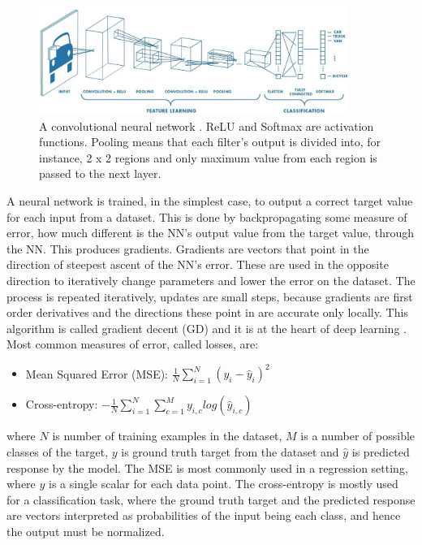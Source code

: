 \begin{figure}[H]
\includegraphics[width=0.9\textwidth,keepaspectratio]{figures/CNN.png}
\caption[A convolutional neural network]{A convolutional neural network \cite{Blog.CNNs}. ReLU \cite{Algo.ReLU} and Softmax are activation functions. Pooling means that each filter's output is divided into, for instance, 2 x 2 regions and only maximum value from each region is passed to the next layer.}
\label{Fig.CNN}
\end{figure}

A neural network is trained, in the simplest case, to output a correct target value for each input from a dataset. This is done by backpropagating some measure of error, how much different is the NN's output value from the target value, through the NN. This produces gradients. Gradients are vectors that point in the direction of steepest ascent of the NN's error. These are used in the opposite direction to iteratively change parameters and lower the error on the dataset. The process is repeated iteratively, updates are small steps, because gradients are first order derivatives and the directions these point in are accurate only locally. This algorithm is called gradient decent (GD) and it is at the heart of deep learning \cite{Book.DeepLearning}. \\
Most common measures of error, called losses, are:
\begin{itemize}
\item Mean Squared Error (MSE): $\frac{1}{N}\sum^N_{i=1}(y_i - \hat y_i)^2$
\item Cross-entropy: $-\frac{1}{N}\sum^N_{i=1}\sum^M_{c=1}y_{i,c}log(\hat y_{i,c})$
\end{itemize}
where $N$ is number of training examples in the dataset, $M$ is a number of possible classes of the target, $y$ is ground truth target from the dataset and $\hat y$ is predicted response by the model. The MSE is most commonly used in a regression setting, where $y$ is a single scalar for each data point. The cross-entropy is mostly used for a classification task, where the ground truth target and the predicted response are vectors interpreted as probabilities of the input being each class, and hence the output must be normalized.


